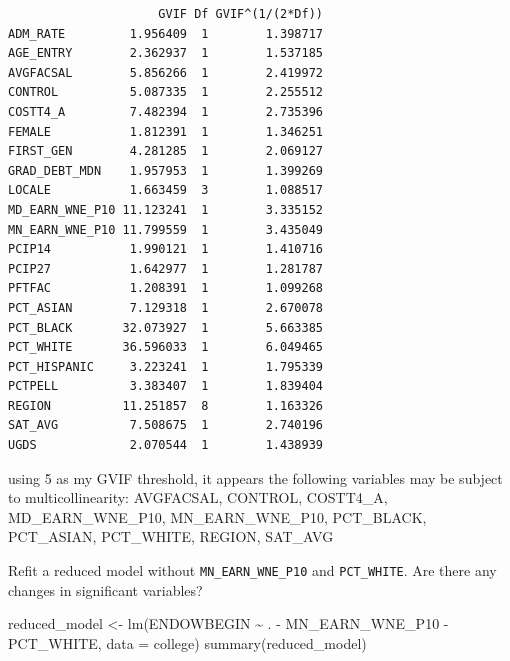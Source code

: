\documentclass[
  letterpaper,
  DIV=11,
  numbers=noendperiod]{scrartcl}
\newenvironment{Shaded}{\begin{snugshade}}{\end{snugshade}}
\newcommand{\AttributeTok}[1]{\textcolor[rgb]{0.40,0.45,0.13}{#1}}
\newcommand{\FunctionTok}[1]{\textcolor[rgb]{0.28,0.35,0.67}{#1}}
\newcommand{\NormalTok}[1]{\textcolor[rgb]{0.00,0.23,0.31}{#1}}
\newcommand{\OtherTok}[1]{\textcolor[rgb]{0.00,0.23,0.31}{#1}}
\newcommand{\SpecialCharTok}[1]{\textcolor[rgb]{0.37,0.37,0.37}{#1}}
\begin{document}
\begin{verbatim}
                     GVIF Df GVIF^(1/(2*Df))
ADM_RATE         1.956409  1        1.398717
AGE_ENTRY        2.362937  1        1.537185
AVGFACSAL        5.856266  1        2.419972
CONTROL          5.087335  1        2.255512
COSTT4_A         7.482394  1        2.735396
FEMALE           1.812391  1        1.346251
FIRST_GEN        4.281285  1        2.069127
GRAD_DEBT_MDN    1.957953  1        1.399269
LOCALE           1.663459  3        1.088517
MD_EARN_WNE_P10 11.123241  1        3.335152
MN_EARN_WNE_P10 11.799559  1        3.435049
PCIP14           1.990121  1        1.410716
PCIP27           1.642977  1        1.281787
PFTFAC           1.208391  1        1.099268
PCT_ASIAN        7.129318  1        2.670078
PCT_BLACK       32.073927  1        5.663385
PCT_WHITE       36.596033  1        6.049465
PCT_HISPANIC     3.223241  1        1.795339
PCTPELL          3.383407  1        1.839404
REGION          11.251857  8        1.163326
SAT_AVG          7.508675  1        2.740196
UGDS             2.070544  1        1.438939
\end{verbatim}

using 5 as my GVIF threshold, it appears the following variables may be
subject to multicollinearity: AVGFACSAL, CONTROL, COSTT4\_A,
MD\_EARN\_WNE\_P10, MN\_EARN\_WNE\_P10, PCT\_BLACK, PCT\_ASIAN,
PCT\_WHITE, REGION, SAT\_AVG

Refit a reduced model without \texttt{MN\_EARN\_WNE\_P10} and
\texttt{PCT\_WHITE}. Are there any changes in significant variables?

\begin{Shaded}
\begin{Highlighting}[]
\NormalTok{reduced\_model }\OtherTok{\textless{}{-}} \FunctionTok{lm}\NormalTok{(ENDOWBEGIN }\SpecialCharTok{\textasciitilde{}}\NormalTok{ . }\SpecialCharTok{{-}}\NormalTok{ MN\_EARN\_WNE\_P10 }\SpecialCharTok{{-}}\NormalTok{ PCT\_WHITE, }\AttributeTok{data =}\NormalTok{ college)}
\FunctionTok{summary}\NormalTok{(reduced\_model)}
\end{Highlighting}
\end{Shaded}
\end{document}
